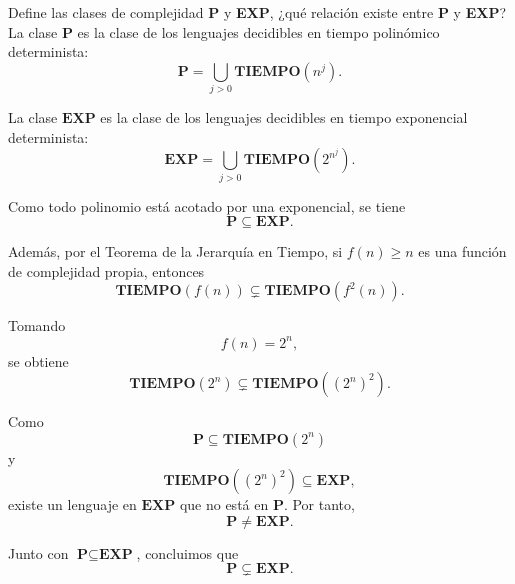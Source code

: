 \documentclass[12pt]{article}
\begin{document}
    \begin{ejercicio}[1.5 puntos]
        Define las clases de complejidad \textbf{P} y \textbf{EXP}, ¿qué relación existe entre \textbf{P} y \textbf{EXP}? \\

        La clase $\textbf{P}$ es la clase de los lenguajes decidibles en tiempo polinómico determinista:
        $$
        \textbf{P}=\bigcup_{j>0}\textbf{TIEMPO}(n^j).
        $$

        La clase $\textbf{EXP}$ es la clase de los lenguajes decidibles en tiempo exponencial determinista:
        $$
        \textbf{EXP}=\bigcup_{j>0}\textbf{TIEMPO}(2^{n^j}).
        $$

        Como todo polinomio está acotado por una exponencial, se tiene
        $$
        \textbf{P}\subseteq \textbf{EXP}.
        $$

        Además, por el Teorema de la Jerarquía en Tiempo, si $f(n)\geq n$ es una función de complejidad propia, entonces
        $$
        \textbf{TIEMPO}(f(n)) \subsetneq \textbf{TIEMPO}(f^2(n)).
        $$

        Tomando
        $$
        f(n)=2^n,
        $$
        se obtiene
        $$
        \textbf{TIEMPO}(2^n)\subsetneq \textbf{TIEMPO}((2^n)^2).
        $$

        Como
        $$
        \textbf{P}\subseteq \textbf{TIEMPO}(2^n)
        $$
        y
        $$
        \textbf{TIEMPO}((2^n)^2)\subseteq \textbf{EXP},
        $$
        existe un lenguaje en $\textbf{EXP}$ que no está en $\textbf{P}$. Por tanto,
        $$
        \textbf{P}\neq \textbf{EXP}.
        $$

        Junto con $\textbf{P}\subseteq \textbf{EXP}$, concluimos que
        $$
        \textbf{P}\subsetneq \textbf{EXP}.
        $$
    \end{ejercicio}

    \newpage
\end{document}
